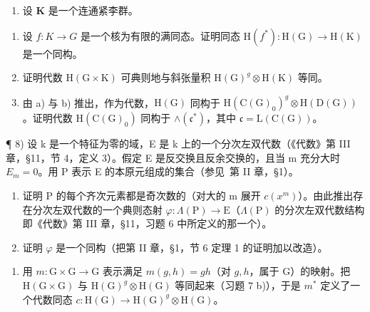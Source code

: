 \begin{enumerate}
\begin{enumerate}
\def\labelenumi{\arabic{enumi})}
\setcounter{enumi}{6}
\tightlist
\item
  设 \(\mathbf{K}\) 是一个连通紧李群。
\end{enumerate}

\begin{enumerate}
\def\labelenumi{\alph{enumi})}
\item
  设 \(f: K \to G\) 是一个核为有限的满同态。证明同态 \(\mathrm{H}(f^{*}) : \mathrm{H}(\mathrm{G}) \to \mathrm{H}(\mathrm{K})\) 是一个同构。
\item
  证明代数 \(\mathrm{H}(\mathrm{G}\times\mathrm{K})\) 可典则地与斜张量积 \(\mathrm{H}(\mathrm{G})^{g}\otimes\mathrm{H}(\mathrm{K})\) 等同。
\item
  由 a) 与 b) 推出，作为代数，\(\mathrm{H}(\mathrm{G})\) 同构于 \(\mathrm{H}(\mathrm{C}(\mathrm{G})_{0})^{g}\otimes\mathrm{H}(\mathrm{D}(\mathrm{G}))\)。证明代数 \(\mathrm{H}(\mathrm{C}(\mathrm{G})_{0})\) 同构于 \(\wedge(\mathfrak{c}^{*})\)，其中 \(\mathfrak{c}=\mathrm{L}(\mathrm{C}(\mathrm{G}))\)。
\end{enumerate}

¶ 8) 设 k 是一个特征为零的域，E 是 k 上的一个分次左双代数（《代数》第 III 章，§11，节 4，定义 3）。假定 E 是反交换且反余交换的，且当 m 充分大时 \(E_{m} = 0\)。用 P 表示 E 的本原元组成的集合（参见~第 II 章，§1）。

\begin{enumerate}
\def\labelenumi{\alph{enumi})}
\item
  证明 P 的每个齐次元素都是奇次数的（对大的 m 展开 \(c(x^{m})\)）。由此推出存在分次左双代数的一个典则态射 \(\varphi : \Lambda(\mathrm{P}) \to \mathrm{E}\)（\(\Lambda(\mathrm{P})\) 的分次左双代数结构即《代数》第 III 章，§11，习题 6 中所定义的那一个）。
\item
  证明 \(\varphi\) 是一个同构（把第 II 章，§1，节 6 定理 1 的证明加以改造）。
\end{enumerate}

\begin{enumerate}
\def\labelenumi{\arabic{enumi})}
\setcounter{enumi}{8}
\tightlist
\item
  用 \(m: \mathrm{G} \times \mathrm{G} \to \mathrm{G}\) 表示满足 \(m(g, h) = gh\)（对 \(g, h\)，属于 \(\mathrm{G}\)）的映射。把 \(\mathrm{H}(\mathrm{G} \times \mathrm{G})\) 与 \(\mathrm{H}(\mathrm{G})^g \otimes \mathrm{H}(\mathrm{G})\) 等同起来（习题 7 b)），于是 \(m^*\) 定义了一个代数同态 \(c: \mathrm{H}(\mathrm{G}) \to \mathrm{H}(\mathrm{G})^g \otimes \mathrm{H}(\mathrm{G})\)。
\end{enumerate}


\end{enumerate}
